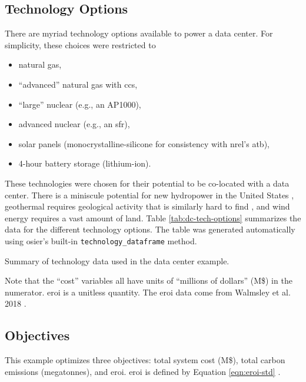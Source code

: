 \subsection{Technology Options}
There are myriad technology options available to power a data center. For
simplicity, these choices were restricted to 
\begin{itemize}
    \item natural gas,
    \item ``advanced'' natural gas with \ac{ccs},
    \item ``large'' nuclear (e.g., an AP1000),
    \item advanced nuclear (e.g., an \ac{sfr}),
    \item solar panels (monocrystalline-silicone for consistency with
    \ac{nrel}'s \ac{atb}),
    \item 4-hour battery storage (lithium-ion).
\end{itemize}

\noindent
These technologies were chosen for their potential to be co-located with a data
center. There is a miniscule potential for new hydropower in the United States
\cite{lopez_us_2012}, geothermal requires geological activity that is similarly
hard to find \cite{lopez_us_2012}, and wind energy requires a vast amount of
land. Table \ref{tab:dc-tech-options} summarizes the data for the different
technology options. The table was generated automatically using \ac{osier}'s
built-in \texttt{technology\_dataframe} method. 
\begin{table}[htpb!]
    \centering
    \caption{Summary of technology data used in the data center example.}
    \label{tab:dc-tech-options}
    \resizebox{\columnwidth}{!}{}
\end{table}
\noindent
Note that the ``cost'' variables all have units of ``millions of dollars'' (M\$)
in the numerator. \ac{eroi} is a unitless quantity. The \ac{eroi} data come from
Walmsley et al. 2018 \cite{walmsley_energy_2018}.
 
\FloatBarrier

\subsection{Objectives}
This example optimizes three objectives: total system cost (M\$), total carbon
emissions (megatonnes), and \ac{eroi}. \ac{eroi} is defined by Equation
\ref{eqn:eroi-std} \cite{walmsley_energy_2018}.

